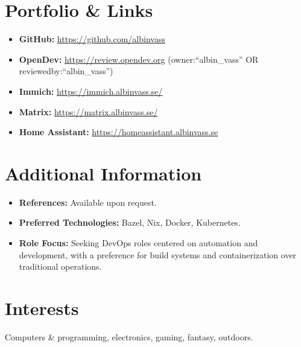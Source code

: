 \documentclass[11pt,a4paper]{article}
\begin{document}
\section{Portfolio \& Links}
\begin{itemize}[leftmargin=*]
    \item \textbf{GitHub:} \href{https://github.com/albinvass}{https://github.com/albinvass}
    \item \textbf{OpenDev:} \href{https://review.opendev.org}{https://review.opendev.org} (owner:``albin\_vass'' OR reviewedby:``albin\_vass'')
    \item \textbf{Immich:} \href{https://immich.albinvass.se/}{https://immich.albinvass.se/}
    \item \textbf{Matrix:} \href{https://matrix.albinvass.se/}{https://matrix.albinvass.se/}
    \item \textbf{Home Assistant:} \href{https://homeassistant.albinvass.se}{https://homeassistant.albinvass.se}
\end{itemize}

\section{Additional Information}
\begin{itemize}[leftmargin=*]
    \item \textbf{References:} Available upon request.
    \item \textbf{Preferred Technologies:} Bazel, Nix, Docker, Kubernetes.
    \item \textbf{Role Focus:} Seeking DevOps roles centered on automation and development, with a preference for build systems and containerization over traditional operations.
\end{itemize}

\section{Interests}
Computers \& programming, electronics, gaming, fantasy, outdoors.
\end{document}
